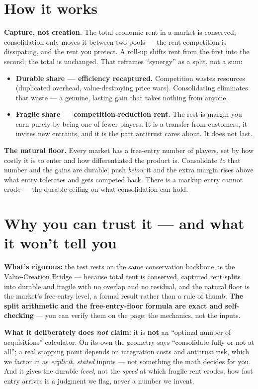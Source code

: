 \documentclass[11pt]{article}
\newcommand{\durable}{\textcolor{creoaccent}{\textbf{Durable}}}
\newcommand{\fragile}{\textcolor{gray!55!black}{\textbf{Fragile}}}
\begin{document}
\section{How it works}
\textbf{Capture, not creation.} The total economic rent in a market is conserved; consolidation
only moves it between two pools --- the rent competition is dissipating, and the rent you
protect. A roll-up shifts rent from the first into the second; the total is unchanged. That
reframes ``synergy'' as a split, not a sum:
\begin{itemize}
  \item \durable{} \textbf{share --- efficiency recaptured.} Competition wastes resources
  (duplicated overhead, value-destroying price wars). Consolidating eliminates that waste ---
  a genuine, lasting gain that takes nothing from anyone.
  \item \fragile{} \textbf{share --- competition-reduction rent.} The rest is margin you earn
  purely by being one of fewer players. It is a transfer from customers, it invites new
  entrants, and it is the part antitrust cares about. It does not last.
\end{itemize}
\textbf{The natural floor.} Every market has a free-entry number of players, set by how costly it
is to enter and how differentiated the product is. Consolidate \emph{to} that number and the gains
are durable; push \emph{below} it and the extra margin rises above what entry tolerates and gets
competed back. There is a markup entry cannot erode --- the durable ceiling on what consolidation
can hold.

\section{Why you can trust it --- and what it won't tell you}
\textbf{What's rigorous:} the test rests on the same conservation backbone as the Value-Creation
Bridge --- because total rent is conserved, captured rent splits into durable and fragile with no
overlap and no residual, and the natural floor is the market's free-entry level, a formal result
rather than a rule of thumb. \textbf{The split arithmetic and the free-entry-floor formula are
exact and self-checking} --- you can verify them on the page; the mechanics, not the inputs.

\smallskip
\textbf{What it deliberately does \emph{not} claim:} it is \textbf{not} an ``optimal number of
acquisitions'' calculator. On its own the geometry says ``consolidate fully or not at all''; a real
stopping point depends on integration costs and antitrust risk, which we factor in as
\emph{explicit, stated} inputs --- not something the math decides for you. And it gives the durable
\emph{level}, not the \emph{speed} at which fragile rent erodes; how fast entry arrives is a
judgment we flag, never a number we invent.
\end{document}
